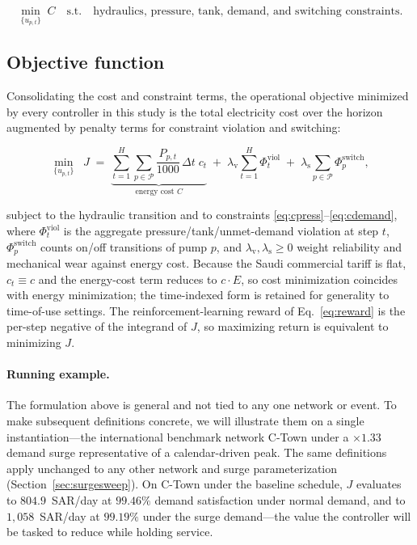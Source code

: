 \documentclass[11pt,a4paper]{article}
\begin{document}
\begin{equation}
\label{eq:opt}
\min_{\{u_{p,t}\}} \; C
\quad \text{s.t.} \quad
\text{hydraulics, pressure, tank, demand, and switching constraints.}
\end{equation}

\subsection{Objective function}
\label{sec:objective}
Consolidating the cost and constraint terms, the operational objective minimized
by every controller in this study is the total electricity cost over the horizon
augmented by penalty terms for constraint violation and switching:

\begin{equation}
\label{eq:objective}
\min_{\{u_{p,t}\}} \;\; J \;=\;
\underbrace{\sum_{t=1}^{H}\sum_{p\in\mathcal{P}} \frac{P_{p,t}}{1000}\,\Delta t\; c_t}_{\text{energy cost } C}
\;+\; \lambda_{\mathrm{v}} \sum_{t=1}^{H}\Phi^{\mathrm{viol}}_t
\;+\; \lambda_{\mathrm{s}} \sum_{p\in\mathcal{P}}\Phi^{\mathrm{switch}}_p,
\end{equation}

subject to the hydraulic transition and to constraints
\eqref{eq:cpress}--\eqref{eq:cdemand}, where $\Phi^{\mathrm{viol}}_t$ is the
aggregate pressure/tank/unmet-demand violation at step $t$,
$\Phi^{\mathrm{switch}}_p$ counts on/off transitions of pump $p$, and
$\lambda_{\mathrm{v}},\lambda_{\mathrm{s}}\ge 0$ weight reliability and
mechanical wear against energy cost. Because the Saudi commercial tariff is flat,
$c_t \equiv c$ and the energy-cost term reduces to $c\cdot E$, so cost
minimization coincides with energy minimization; the time-indexed form is
retained for generality to time-of-use settings. The reinforcement-learning
reward of Eq.~\eqref{eq:reward} is the per-step negative of the integrand of
$J$, so maximizing return is equivalent to minimizing $J$.

\paragraph{Running example.} The formulation above is general and not tied to
any one network or event. To make subsequent definitions concrete, we will
illustrate them on a single instantiation---the international benchmark network
C-Town under a $\times 1.33$ demand surge representative of a calendar-driven
peak. The same definitions apply unchanged to any other network and surge
parameterization (Section~\ref{sec:surgesweep}). On C-Town under the baseline
schedule, $J$ evaluates to $804.9$~SAR/day at $99.46\%$ demand satisfaction
under normal demand, and to $1{,}058$~SAR/day at $99.19\%$ under the surge
demand---the value the controller will be tasked to reduce while holding
service.
\end{document}
